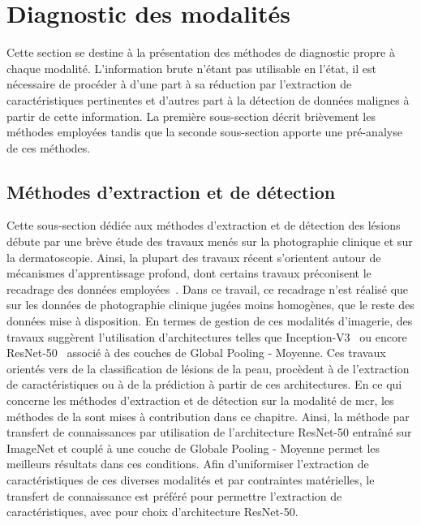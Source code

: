 \section{Diagnostic des modalités}
\label{sec:modality_diagnosis}
Cette section se destine à la présentation des méthodes de diagnostic propre à chaque modalité. L'information brute n'étant pas utilisable en l'état, il est nécessaire de procéder à d'une part à sa réduction par l'extraction de caractéristiques pertinentes et d'autres part à la détection de données malignes à partir de cette information. La première sous-section décrit brièvement les méthodes employées tandis que la seconde sous-section apporte une pré-analyse de ces méthodes.\par

\subsection{Méthodes d'extraction et de détection}
Cette sous-section dédiée aux méthodes d'extraction et de détection des lésions débute par une brève étude des travaux menés sur la photographie clinique et sur la dermatoscopie. Ainsi, la plupart des travaux récent s'orientent autour de mécanismes d'apprentissage profond, dont certains travaux préconisent le recadrage des données employées~\cite{Li2018}. Dans ce travail, ce recadrage n'est réalisé que sur les données de photographie clinique jugées moins homogènes, que le reste des données mise à disposition. En termes de gestion de ces modalités d'imagerie, des travaux suggèrent l'utilisation d'architectures telles que Inception-V3~\cite{Esteva2017,Fan2020} ou encore ResNet-50~\cite{Xie2018, Alantari2018} associé à des couches de Global Pooling - Moyenne. Ces travaux orientés vers de la classification de lésions de la peau, procèdent à de l'extraction de caractéristiques ou à de la prédiction à partir de ces architectures. En ce qui concerne les méthodes d'extraction et de détection sur la modalité de \gls{mcr}, les méthodes de la  sont mises à contribution dans ce chapitre. Ainsi, la méthode par transfert de connaissances par utilisation de l'architecture ResNet-50 entraîné sur ImageNet et couplé à une couche de Globale Pooling - Moyenne permet les meilleurs résultats dans ces conditions. Afin d'uniformiser l'extraction de caractéristiques de ces diverses modalités et par contraintes matérielles, le transfert de connaissance est préféré pour permettre l'extraction de caractéristiques, avec pour choix d'architecture ResNet-50.\par

